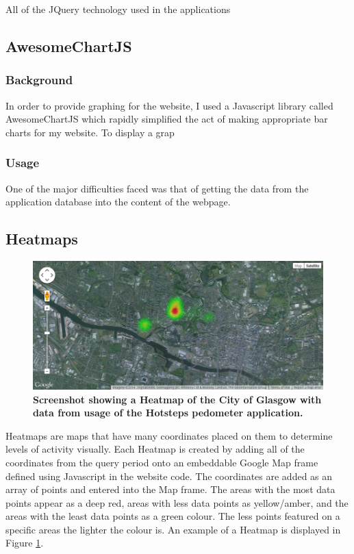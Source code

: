 \documentclass{l4proj}
\begin{document}
All of the JQuery technology used in the applications 

\subsection{AwesomeChartJS}

\subsubsection{Background}

In order to provide graphing for the website, I used a Javascript library called AwesomeChartJS which rapidly simplified the act of making appropriate bar charts for my website. To display a grap

\subsubsection{Usage}

One of the major difficulties faced was that of getting the data from the application database into the content of the webpage.

\subsection{Heatmaps}

\begin{figure}[H]
\centering
\includegraphics[scale=0.5]{images/screenshots/heatmapscreen.png}
\caption{\textbf{Screenshot showing a Heatmap of the City of Glasgow with data from usage of the Hotsteps pedometer application.}}
\label{impl:heatmapscreen}
\end{figure}

Heatmaps are maps that have many coordinates placed on them to determine levels of activity visually. Each Heatmap is created by adding all of the coordinates from the query period onto an embeddable Google Map frame defined using Javascript in the website code. The coordinates are added as an array of points and entered into the Map frame. The areas with the most data points appear as a deep red, areas with less data points as yellow/amber, and the areas with the least data points as a green colour. The less points featured on a specific areas the lighter the colour is. An example of a Heatmap is displayed in Figure \ref{impl:heatmapscreen}. 
\end{document}
